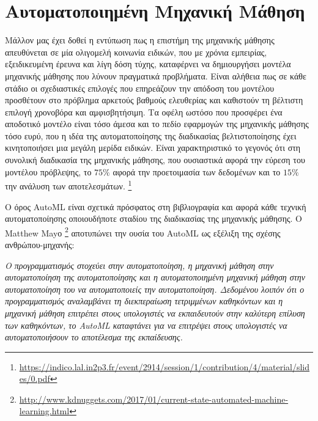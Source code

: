 \section{Αυτοματοποιημένη Μηχανική Μάθηση}
 Μάλλον μας έχει δοθεί η εντύπωση πως η επιστήμη της μηχανικής μάθησης απευθύνεται σε μία ολιγομελή κοινωνία ειδικών, που με χρόνια εμπειρίας, εξειδικευμένη έρευνα και λίγη δόση τύχης, καταφέρνει να δημιουργήσει μοντέλα μηχανικής μάθησης που λύνουν πραγματικά προβλήματα. Είναι αλήθεια πως σε κάθε στάδιο οι σχεδιαστικές επιλογές που επηρεάζουν την απόδοση του μοντέλου προσθέτουν στο πρόβλημα αρκετούς βαθμούς ελευθερίας και καθιστούν τη βέλτιστη επιλογή χρονοβόρα και αμφισβητήσιμη. Τα οφέλη ωστόσο που προσφέρει ένα αποδοτικό μοντέλο είναι τόσο άμεσα και το πεδίο εφαρμογών της μηχανικής μάθησης τόσο ευρύ, που η ιδέα της αυτοματοποίησης της διαδικασίας βελτιστοποίησης έχει κινητοποιήσει μια μεγάλη μερίδα ειδικών. Είναι χαρακτηριστικό
 το γεγονός ότι στη συνολική διαδικασία της μηχανικής μάθησης, που ουσιαστικά αφορά την εύρεση του μοντέλου πρόβλεψης, το $75\%$ αφορά την προετοιμασία των δεδομένων και το $15\%$ την ανάλυση των αποτελεσμάτων. \footnote{\url{https://indico.lal.in2p3.fr/event/2914/session/1/contribution/4/material/slides/0.pdf}}
 
 Ο όρος AutoML είναι σχετικά πρόσφατος στη βιβλιογραφία και αφορά κάθε τεχνική
 αυτοματοποίησης οποιουδήποτε σταδίου της διαδικασίας της μηχανικής μάθησης. Ο Matthew Mayο \footnote{\url{http://www.kdnuggets.com/2017/01/current-state-automated-machine-learning.html}} αποτυπώνει την ουσία του AutoML ως εξέλιξη της σχέσης ανθρώπου-μηχανής:
 
 \begin{displayquote}
 \textit{Ο προγραμματισμός στοχεύει στην αυτοματοποίηση, η μηχανική μάθηση στην αυτοματοποίηση της αυτοματοποίησης και η αυτοματοποιημένη μηχανική μάθηση στην αυτοματοποίηση του να αυτοματοποιείς την αυτοματοποίηση. Δεδομένου λοιπόν ότι ο προγραμματισμός αναλαμβάνει τη διεκπεραίωση τετριμμένων καθηκόντων και η μηχανική μάθηση επιτρέπει στους υπολογιστές να εκπαιδευτούν στην καλύτερη επίλυση των καθηκόντων, το AutoML καταφτάνει για να επιτρέψει στους υπολογιστές να αυτοματοποιήσουν το αποτέλεσμα της εκπαίδευσης.}
 \end{displayquote}
 
